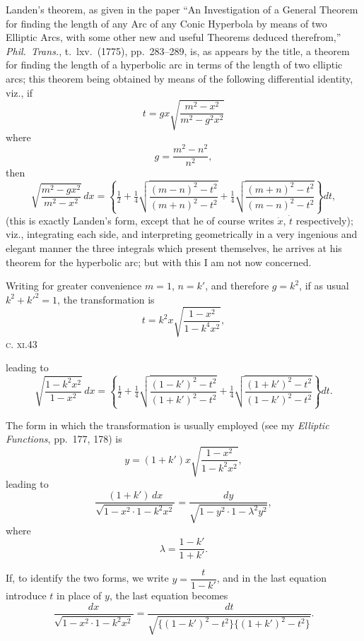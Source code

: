 \documentclass[11pt,a4paper]{article}
\begin{document}
\bigskip

\noindent
Landen's theorem, as given in the paper ``An Investigation of a General
Theorem for finding the length of any Arc of any Conic Hyperbola by
means of two Elliptic Arcs, with some other new and useful Theorems
deduced therefrom,'' \textit{Phil.\ Trans.}, t.~lxv.\ (1775), pp.\ 283--289,
is, as appears by the title, a theorem for finding the length of a
hyperbolic arc in terms of the length of two elliptic arcs; this
theorem being obtained by means of the following differential identity,
viz., if
\[
  t=gx\sqrt{\frac{m^{2}-x^{2}}{m^{2}-g^{2}x^{2}}}
\]
where
\[
  g=\frac{m^{2}-n^{2}}{n^{2}},
\]
then
\[
  \sqrt{\frac{m^{2}-gx^{2}}{m^{2}-x^{2}}}\,dx
  = \left\{\tfrac{1}{2}+\tfrac{1}{4}\sqrt{\frac{(m-n)^{2}-t^{2}}{(m+n)^{2}-t^{2}}}+\tfrac{1}{4}\sqrt{\frac{(m+n)^{2}-t^{2}}{(m-n)^{2}-t^{2}}}\right\}dt,
\]
(this is exactly Landen's form, except that he of course writes $\dot x$,
$\dot t$ respectively); viz., integrating each side, and interpreting
geometrically in a very ingenious and elegant manner the three
integrals which present themselves, he arrives at his theorem for the
hyperbolic arc; but with this I am not now concerned.

Writing for greater convenience $m=1$, $n=k'$, and therefore $g=k^{2}$,
if as usual $k^{2}+k'^{2}=1$, the transformation is
\[
  t=k^{2}x\sqrt{\frac{1-x^{2}}{1-k^{4}x^{2}}},
\]
\hfill\textsc{c. xi.}\hfill 43

\newpage
\noindent
leading to
\[
  \sqrt{\frac{1-k^{2}x^{2}}{1-x^{2}}}\,dx=\left\{\tfrac{1}{2}+\tfrac{1}{4}\sqrt{\frac{(1-k')^{2}-t^{2}}{(1+k')^{2}-t^{2}}}+\tfrac{1}{4}\sqrt{\frac{(1+k')^{2}-t^{2}}{(1-k')^{2}-t^{2}}}\right\}dt.
\]

The form in which the transformation is usually employed (see my
\textit{Elliptic Functions}, pp.\ 177, 178) is
\[
  y=(1+k')x\sqrt{\frac{1-x^{2}}{1-k^{2}x^{2}}},
\]
leading to
\[
  \frac{(1+k')\,dx}{\sqrt{1-x^{2}\cdot 1-k^{2}x^{2}}}=\frac{dy}{\sqrt{1-y^{2}\cdot 1-\lambda^{2}y^{2}}},
\]
where
\[
  \lambda=\frac{1-k'}{1+k'}.
\]

If, to identify the two forms, we write $y=\dfrac{t}{1-k'}$, and in
the last equation introduce $t$ in place of $y$, the last equation becomes
\[
  \frac{dx}{\sqrt{1-x^{2}\cdot 1-k^{2}x^{2}}}=\frac{dt}{\sqrt{\{(1-k')^{2}-t^{2}\}\{(1+k')^{2}-t^{2}\}}}.
\]
\end{document}
